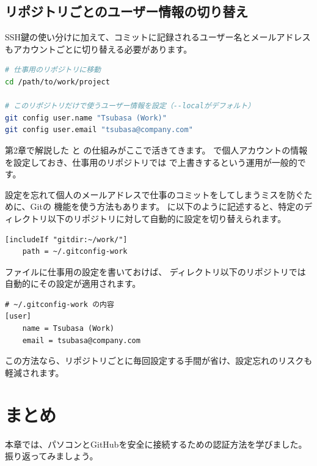 \subsection{リポジトリごとのユーザー情報の切り替え}

SSH鍵の使い分けに加えて、コミットに記録されるユーザー名とメールアドレスもアカウントごとに切り替える必要があります。

\begin{lstlisting}[language=bash]
# 仕事用のリポジトリに移動
cd /path/to/work/project

# このリポジトリだけで使うユーザー情報を設定（--localがデフォルト）
git config user.name "Tsubasa (Work)"
git config user.email "tsubasa@company.com"
\end{lstlisting}

第2章で解説した  と  の仕組みがここで活きてきます。 で個人アカウントの情報を設定しておき、仕事用のリポジトリでは  で上書きするという運用が一般的です。

設定を忘れて個人のメールアドレスで仕事のコミットをしてしまうミスを防ぐために、Gitの  機能を使う方法もあります。 に以下のように記述すると、特定のディレクトリ以下のリポジトリに対して自動的に設定を切り替えられます。

\begin{lstlisting}[language={}]
[includeIf "gitdir:~/work/"]
    path = ~/.gitconfig-work
\end{lstlisting}

 ファイルに仕事用の設定を書いておけば、 ディレクトリ以下のリポジトリでは自動的にその設定が適用されます。

\begin{lstlisting}[language={}]
# ~/.gitconfig-work の内容
[user]
    name = Tsubasa (Work)
    email = tsubasa@company.com
\end{lstlisting}

この方法なら、リポジトリごとに毎回設定する手間が省け、設定忘れのリスクも軽減されます。

\section{まとめ}

本章では、パソコンとGitHubを安全に接続するための認証方法を学びました。振り返ってみましょう。

